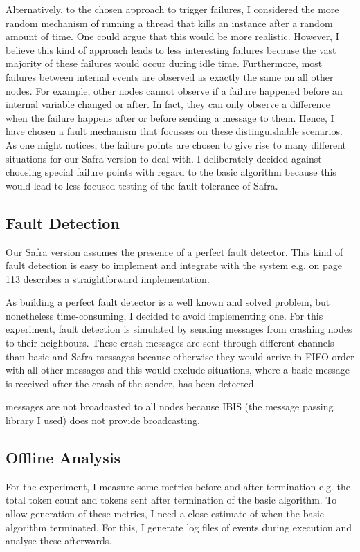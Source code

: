 Alternatively, to the chosen approach to trigger failures, I considered the more random mechanism of running a thread that kills an instance after a random amount of time.
One could argue that this would be more realistic.
However, I believe this kind of approach leads to less interesting failures because the vast majority of these failures would occur during idle time.
Furthermore, most failures between internal events are observed as exactly the same on all other nodes.
For example, other nodes cannot observe if a failure happened before an internal variable changed or after.
In fact, they can only observe a difference when the failure happens after or before sending a message to them.
Hence, I have chosen a fault mechanism that focusses on these distinguishable scenarios.
As one might notices, the failure points are chosen to give rise to many different situations for our Safra version to deal with.
I deliberately decided against choosing special failure points with regard to the basic algorithm because this would lead to less focused testing of the fault tolerance of Safra.

\subsection{Fault Detection}
Our Safra version assumes the presence of a perfect fault detector.
This kind of fault detection is easy to implement and integrate with the system e.g.
\cite{Fokkink:2018} on page 113 describes a straightforward implementation.

As building a perfect fault detector is a well known and solved problem, but nonetheless time-consuming, I decided to avoid implementing one.
For this experiment, fault detection is simulated by sending  messages from crashing nodes to their neighbours.
These crash messages are sent through different channels than basic and Safra messages because otherwise they would arrive in FIFO order with all other messages and this would exclude situations, where a basic message is received after the crash of the sender, has been detected.

 messages are not broadcasted to all nodes because IBIS (the message passing library I used) does not provide broadcasting.


\subsection{Offline Analysis}
\label{ssec:offline-analysis}
For the experiment, I measure some metrics before and after termination e.g. the total token count and tokens sent after termination of the basic algorithm.
To allow generation of these metrics, I need a close estimate of when the basic algorithm terminated.
For this, I generate log files of events during execution and analyse these afterwards.

